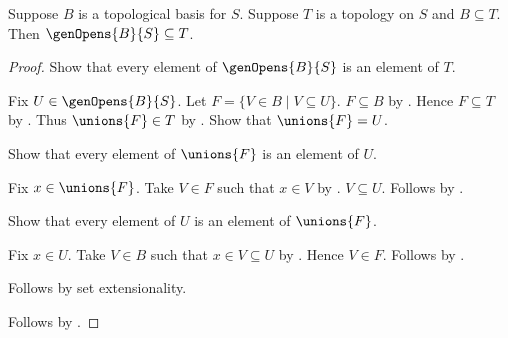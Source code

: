 \begin{theorem}\label{genopens_least_topology}
    Suppose $B$ is a topological basis for $S$.
    Suppose $T$ is a topology on $S$ and $B\subseteq T$.
    Then $\genOpens{B}{S}\subseteq T$.
\end{theorem}
\begin{proof}
    Show that every element of $\genOpens{B}{S}$ is an element of $T$.
    \begin{subproof}
        Fix $U\in\genOpens{B}{S}$.
        Let $F=\{V\in B\mid V\subseteq U\}$.
        $F\subseteq B$ by .
        Hence $F\subseteq T$ by .
        Thus $\unions{F}\in T$ by .
        Show that $\unions{F}=U$.
        \begin{subproof}
            Show that every element of $\unions{F}$ is an element of $U$.
            \begin{subproof}
                Fix $x\in\unions{F}$.
                Take $V\in F$ such that $x\in V$ by .
                $V\subseteq U$.
                Follows by .
            \end{subproof}
            Show that every element of $U$ is an element of $\unions{F}$.
            \begin{subproof}
                Fix $x\in U$.
                Take $V\in B$ such that $x\in V\subseteq U$ by
                    .
                Hence $V\in F$.
                Follows by .
            \end{subproof}
            Follows by set extensionality.
        \end{subproof}
    \end{subproof}
    Follows by .
\end{proof}

